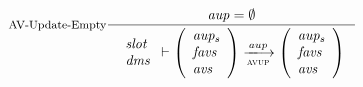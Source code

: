 \begin{figure}[htb]
  \begin{equation}\label{eq:av-update-Empty}
    \inference[AV-Update-Empty]
    {
      \var{aup} = \emptyset
    }
    {
      \begin{array}{l}
        \var{slot}\\
        \var{dms}\\
      \end{array}
      \vdash
      \left(
      \begin{array}{l}
        \var{aup_s}\\
        \var{favs}\\
        \var{avs}\\
      \end{array}
      \right)
      \trans{avup}{aup}
      \left(
      \begin{array}{l}
        \var{aup_s}\\
        \var{favs}\\
        \var{avs}\\
      \end{array}
      \right)
    }
  \end{equation}

  \nextdef


\end{figure}
